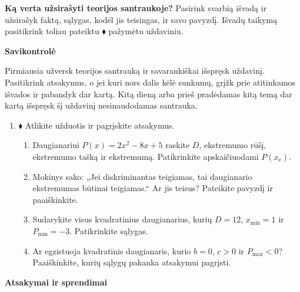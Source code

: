 \documentclass[12pt,a4paper]{article}
\begin{document}
\textbf{Ką verta užsirašyti teorijos santraukoje?} Pasirink svarbią išvadą ir užsirašyk faktą, sąlygas, kodėl jis teisingas, ir savo pavyzdį. Išvadų taikymą pasitikrink toliau pateiktu $\blacklozenge$ pažymėtu uždaviniu.
\newpage
\begin{center}{\Large\bfseries Savikontrolė}\end{center}
Pirmiausia užversk teorijos santrauką ir savarankiškai išspręsk uždavinį. Pasitikrink atsakymus, o jei kuri nors dalis kėlė sunkumų, grįžk prie atitinkamos išvados ir pabandyk dar kartą. Kitą dieną arba prieš pradėdamas kitą temą dar kartą išspręsk šį uždavinį nesinaudodamas santrauka.
\begin{enumerate}[resume]
\item $\blacklozenge$ Atlikite užduotis ir pagrįskite atsakymus.
\begin{enumerate}
\item Daugianariui $P(x)=2x^2-8x+5$ raskite $D$, ekstremumo rūšį, ekstremumo tašką ir ekstremumą. Patikrinkite apskaičiuodami $P(x_{\mathrm e})$.
\item Mokinys sako: „Jei diskriminantas teigiamas, tai daugianario ekstremumas būtinai teigiamas.“ Ar jis teisus? Pateikite pavyzdį ir paaiškinkite.
\item Sudarykite visus kvadratinius daugianarius, kurių $D=12$, $x_{\min}=1$ ir $P_{\min}=-3$. Patikrinkite sąlygas.
\item Ar egzistuoja kvadratinis daugianaris, kurio $b=0$, $c>0$ ir $P_{\max}<0$? Paaiškinkite, kurių sąlygų pakanka atsakymui pagrįsti.
\end{enumerate}
\end{enumerate}
\newpage\begin{center}{\Large\bfseries Atsakymai ir sprendimai}\end{center}
\end{document}
